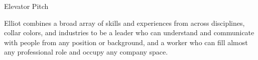 \documentclass{resume} %
\begin{document}

\begin{rSection}{Elevator Pitch}

Elliot combines a broad array of skills and experiences from across disciplines, collar colors, and industries to be a leader who can understand and communicate with people from any position or background, and a worker who can fill almost any professional role and occupy any company space. \\

\end{rSection}
\fi
\end{document}
